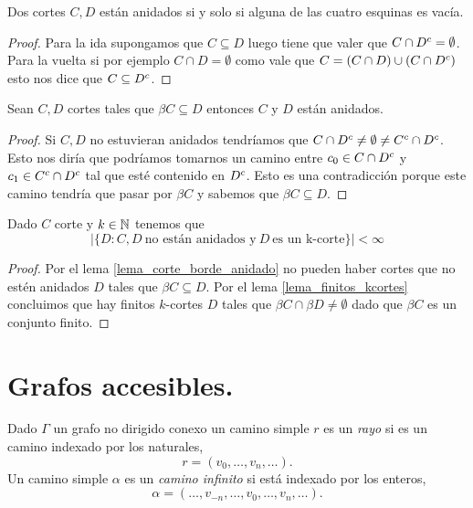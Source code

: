 \documentclass[tesis.tex]{subfiles}
\begin{document}
\begin{lema}
	Dos cortes $C,D$ están anidados si y solo si alguna de las cuatro esquinas es vacía.
\end{lema}
\begin{proof}
	Para la ida supongamos que $C \subseteq D$ luego tiene que valer que $C \cap D^{c} = \emptyset$.
	Para la vuelta si por ejemplo $C \cap D = \emptyset$ como vale que $C = (C \cap D) \cup (C \cap D^{c})$ esto nos dice que $C \subseteq D^{c}$.
	
\end{proof}

\begin{lema}\label{lema_corte_borde_anidado}
	Sean $C,D$ cortes tales que $\beta C \subseteq D$ entonces $C$ y $D$ están anidados.
\end{lema}
\begin{proof}
	Si $C,D$ no estuvieran anidados tendríamos que $C \cap D^{c} \neq \emptyset \neq C^{c} \cap D^{c}$.
	Esto nos diría que podríamos tomarnos un camino entre $c_0 \in C \cap D^{c}$ y $c_1 \in C^{c} \cap D^{c}$ tal que esté contenido en $D^{c}$.
	Esto es una contradicción porque este camino tendría que pasar por $\beta C$ y sabemos que $\beta C \subseteq D$.
	
\end{proof}


\begin{lema}
	Dado $C$ corte y $k \in \mathbb{N}$ tenemos que 
	\[
	| \{  D : C, D \ \text{no están anidados y} \ D \ \text{es un k-corte}   \} | < \infty
	\]
\end{lema}
\begin{proof}
	Por el lema \ref{lema_corte_borde_anidado} no pueden haber cortes que no estén anidados $D$ tales que $\beta C \subseteq D$.
	Por el lema \ref{lema_finitos_kcortes} concluimos que hay finitos $k$-cortes $D$ tales que $\beta C \cap \beta D \neq \emptyset$ dado que $\beta C$ es un conjunto finito.
				
\end{proof}


\section{Grafos accesibles.}\label{secc_grafos_accesibles}

\begin{deff}
	Dado $\Gamma$ un grafo no dirigido conexo un camino simple $r$ es un \emph{rayo} si es un camino indexado por los naturales,
	\[
	r = (v_0, \dots, v_{n}, \dots).
	\]	
	Un camino simple $\alpha$ es un \emph{camino infinito} si está indexado por los enteros,
	\[
	\alpha = ( \dots, v_{-n}, \dots, v_0, \dots, v_{n}, \dots ).
	\]
\end{deff}		
\end{document}
